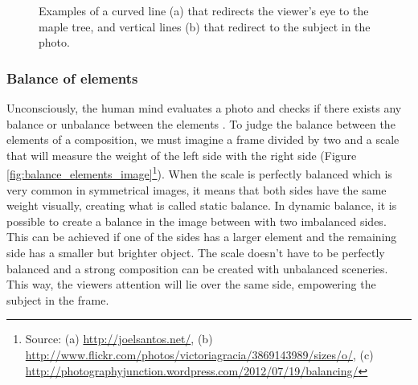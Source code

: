 \begin{figure}[htbp]
        \centering
  \caption{Examples of a curved line (a) that redirects the viewer's eye to the maple tree, and vertical lines (b) that redirect to the subject in the photo.}
  \label{fig:leading_lines_image}
\end{figure}

\subsubsection{Balance of elements}
\label{subsub:balance_elements}

Unconsciously, the human mind evaluates a photo and checks if there exists any balance or unbalance between the elements \cite{Santos}.
To judge the balance between the elements of a composition, we must imagine a frame divided by two and a scale that will measure the weight of the left side with the right side (Figure \ref{fig:balance_elements_image}\footnote{Source: (a) \url{http://joelsantos.net/}, (b) \url{http://www.flickr.com/photos/victoriagracia/3869143989/sizes/o/}, (c) \url{http://photographyjunction.wordpress.com/2012/07/19/balancing/}
}).
When the scale is perfectly balanced which is very common in symmetrical images, it means that both sides have the same weight visually, creating what is called static balance.
In dynamic balance, it is possible to create a balance in the image between with two imbalanced sides. This can be achieved if one of the sides has a larger element and the remaining side has a smaller but brighter object.
The scale doesn't have to be perfectly balanced and a strong composition can be created with unbalanced sceneries. This way, the viewers attention will lie over the same side, empowering the subject in the frame.


